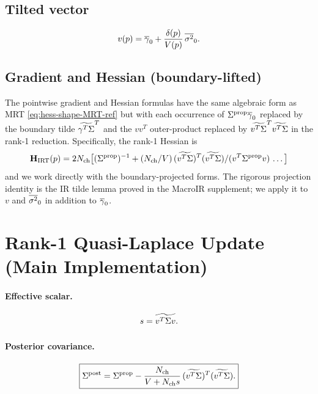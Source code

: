\documentclass[11pt]{article}
\begin{document}
\subsection{Tilted vector}

\begin{equation}
  v(p) = \overline{\gamma}_0 + \frac{\delta(p)}{V(p)}\,\overline{\sigma^2}_0.
  \label{eq:vdef}
\end{equation}

\subsection{Gradient and Hessian (boundary-lifted)}

The pointwise gradient and Hessian formulas have the same algebraic
form as MRT \eqref{eq:hess-shape-MRT-ref} but with each occurrence of
$\Sigma^{\mathrm{prop}}\overline{\gamma}_0$ replaced by the boundary tilde
$\widetilde{\gamma^{T}\Sigma}^{T}$ and the $vv^{T}$ outer-product replaced by
$\widetilde{v^{T}\Sigma}^{T}\widetilde{v^{T}\Sigma}$ in the rank-1 reduction. Specifically, the rank-1
Hessian is
\begin{equation}
  \mathbf{H}_{\mathrm{IRT}}(p)
  = 2N_{\mathrm{ch}}\bigl[(\Sigma^{\mathrm{prop}})^{-1}
  + (N_{\mathrm{ch}}/V)\,(\widetilde{v^{T}\Sigma})^{T}(\widetilde{v^{T}\Sigma})/(v^{T}\Sigma^{\mathrm{prop}}v)\,\dots\bigr]
  \label{eq:hess-IRT-shape}
\end{equation}
and we work directly with the boundary-projected forms. The rigorous
projection identity is the IR tilde lemma proved in the MacroIR
supplement; we apply it to $v$ and $\overline{\sigma^2}_0$ in addition to $\overline{\gamma}_0$.

\section{Rank-1 Quasi-Laplace Update (Main Implementation)}

\paragraph{Effective scalar.}
\begin{equation}
  s = \widetilde{v^{T}\Sigma v}.
  \label{eq:s}
\end{equation}

\paragraph{Posterior covariance.}
\begin{equation}
  \boxed{
    \Sigma^{\mathrm{post}}
    = \Sigma^{\mathrm{prop}}
    - \frac{N_{\mathrm{ch}}}{V+N_{\mathrm{ch}} s}\,
      (\widetilde{v^{T}\Sigma})^{T}(\widetilde{v^{T}\Sigma}).
  }
  \label{eq:Sigma_post}
\end{equation}
\end{document}
